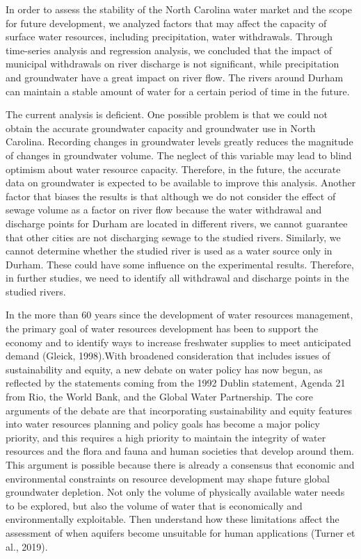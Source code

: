 \documentclass[
  12pt,
]{article}
\begin{document}
In order to assess the stability of the North Carolina water market and
the scope for future development, we analyzed factors that may affect
the capacity of surface water resources, including precipitation, water
withdrawals. Through time-series analysis and regression analysis, we
concluded that the impact of municipal withdrawals on river discharge is
not significant, while precipitation and groundwater have a great impact
on river flow. The rivers around Durham can maintain a stable amount of
water for a certain period of time in the future.

The current analysis is deficient. One possible problem is that we could
not obtain the accurate groundwater capacity and groundwater use in
North Carolina. Recording changes in groundwater levels greatly reduces
the magnitude of changes in groundwater volume. The neglect of this
variable may lead to blind optimism about water resource capacity.
Therefore, in the future, the accurate data on groundwater is expected
to be available to improve this analysis. Another factor that biases the
results is that although we do not consider the effect of sewage volume
as a factor on river flow because the water withdrawal and discharge
points for Durham are located in different rivers, we cannot guarantee
that other cities are not discharging sewage to the studied rivers.
Similarly, we cannot determine whether the studied river is used as a
water source only in Durham. These could have some influence on the
experimental results. Therefore, in further studies, we need to identify
all withdrawal and discharge points in the studied rivers.

In the more than 60 years since the development of water resources
management, the primary goal of water resources development has been to
support the economy and to identify ways to increase freshwater supplies
to meet anticipated demand (Gleick, 1998).With broadened consideration
that includes issues of sustainability and equity, a new debate on water
policy has now begun, as reflected by the statements coming from the
1992 Dublin statement, Agenda 21 from Rio, the World Bank, and the
Global Water Partnership. The core arguments of the debate are that
incorporating sustainability and equity features into water resources
planning and policy goals has become a major policy priority, and this
requires a high priority to maintain the integrity of water resources
and the flora and fauna and human societies that develop around them.
This argument is possible because there is already a consensus that
economic and environmental constraints on resource development may shape
future global groundwater depletion. Not only the volume of physically
available water needs to be explored, but also the volume of water that
is economically and environmentally exploitable. Then understand how
these limitations affect the assessment of when aquifers become
unsuitable for human applications (Turner et al., 2019).
\end{document}
